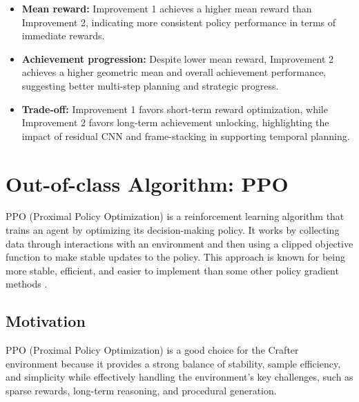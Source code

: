 \documentclass[twocolumn]{article}
\begin{document}
\begin{itemize}
	\item \textbf{Mean reward:} Improvement 1 achieves a higher mean reward than Improvement 2, indicating more consistent policy performance in terms of immediate rewards.
	\item \textbf{Achievement progression:} Despite lower mean reward, Improvement 2 achieves a higher geometric mean and overall achievement performance, suggesting better multi-step planning and strategic progress.
	\item \textbf{Trade-off:} Improvement 1 favors short-term reward optimization, while Improvement 2 favors long-term achievement unlocking, highlighting the impact of residual CNN and frame-stacking in supporting temporal planning.
\end{itemize}

\section*{Out-of-class Algorithm: PPO}

PPO (Proximal Policy Optimization) is a reinforcement learning algorithm that trains an agent by optimizing its decision-making policy. It works by collecting data through interactions with an environment and then using a clipped objective function to make stable updates to the policy. This approach is known for being more stable, efficient, and easier to implement than some other policy gradient methods \parencite{schulman}.

\subsection*{Motivation}
PPO (Proximal Policy Optimization) is a good choice for the Crafter environment because it provides a strong balance of stability, sample efficiency, and simplicity while effectively handling the environment's key challenges, such as sparse rewards, long-term reasoning, and procedural generation. 
\end{document}
